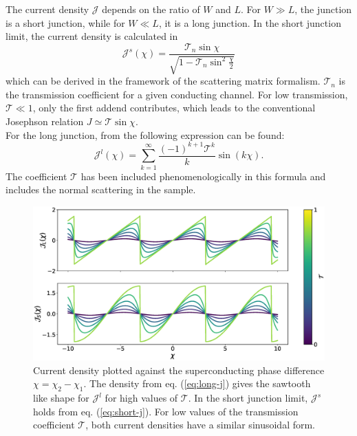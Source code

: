 The current density $\mathcal{J}$ depends on the ratio of $W$ and $L$. For $W \gg L$, the junction is a short junction, while for $W \ll L$, it is a long junction. 
In the short junction limit, the current density is calculated in \cite{Beenakker1991}
\begin{equation}
\mathcal{J}^s (\chi) = \frac{\mathcal{T}_n \sin \chi}{\sqrt{1 - \mathcal{T}_n \sin^2 \frac{\chi}{2}}}\label{eq:short-j}
\end{equation}
which can be derived in the framework of the scattering matrix formalism. $\mathcal{T}_n$ is the transmission coefficient for a given conducting channel. For low transmission, $\mathcal{T} \ll 1$, only the first addend contributes, which leads to the conventional Josephson relation $J \simeq \mathcal{T} \sin \chi$.\\
For the long junction, from \cite{Barzykin1999} the following expression can be found:
\begin{equation}
\mathcal{J}^l(\chi) = \sum_{k = 1}^{\infty} \frac{(-1)^{k+1} \mathcal{T}^k}{k} \sin( k \chi).\label{eq:long-j}
\end{equation}
The coefficient $\mathcal{T}$ has been included phenomenologically in this formula and includes the normal scattering in the sample.
\begin{figure}
\centering
\includegraphics[width=\textwidth]{figure/analyticalmodel/current_density_all}
\caption{Current density plotted against the superconducting phase difference $\chi = \chi_2 - \chi_1$. The density from eq. (\ref{eq:long-j}) gives the sawtooth like shape for $\mathcal{J}^l$ for high values of $\mathcal{T}$. In the short junction limit, $\mathcal{J}^s$ holds from eq. (\ref{eq:short-j}). For low values of the transmission coefficient $\mathcal{T}$, both current densities have a similar sinusoidal form. }
\label{fig:current_density}
\end{figure}
